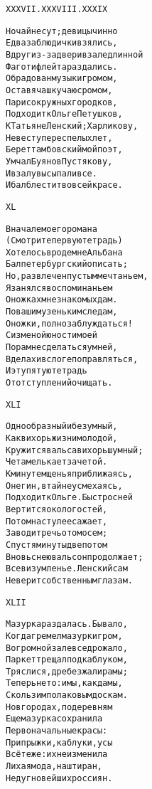 \begin{minipage}[t]{\dimexpr 0.5\textwidth -\tabcolsep-.5pt}
\begin{alltt}\normalfont\centering
XXXVII. XXXVIII. XXXIX

Но чай несут; девицы чинно
Едва за блюдички взялись,
Вдруг из-за двери в зале длинной
Фагот и флейта раздались.
Обрадован музыки громом,
Оставя чашку чаю с ромом,
Парис окружных городков,
Подходит к Ольге Петушков,
К Татьяне Ленский; Харликову,
Невесту переспелых лет,
Берет тамбовский мой поэт,
Умчал Буянов Пустякову,
И в залу высыпали все.
И бал блестит во всей красе.
\end{alltt}
\end{minipage}

\begin{minipage}[t]{\dimexpr 0.5\textwidth -\tabcolsep-.5pt}
\begin{alltt}\normalfont\centering
XL

В начале моего романа
(Смотрите первую тетрадь)
Хотелось вроде мне Альбана
Бал петербургский описать;
Но, развлечен пустым мечтаньем,
Я занялся воспоминаньем
О ножках мне знакомых дам.
По вашим узеньким следам,
О ножки, полно заблуждаться!
С изменой юности моей
Пора мне сделаться умней,
В делах и в слоге поправляться,
И эту пятую тетрадь
От отступлений очищать.
\end{alltt}
\end{minipage}
\clearpage

\begin{minipage}[t]{\dimexpr 0.5\textwidth -\tabcolsep-.5pt}
\begin{alltt}\normalfont\centering
XLI

Однообразный и безумный,
Как вихорь жизни молодой,
Кружится вальса вихорь шумный;
Чета мелькает за четой.
К минуте мщенья приближаясь,
Онегин, втайне усмехаясь,
Подходит к Ольге. Быстро с ней
Вертится около гостей,
Потом на стул ее сажает,
Заводит речь о том о сем;
Спустя минуты две потом
Вновь с нею вальс он продолжает;
Все в изумленье. Ленский сам
Не верит собственным глазам.
\end{alltt}
\end{minipage}

\begin{minipage}[t]{\dimexpr 0.5\textwidth -\tabcolsep-.5pt}
\begin{alltt}\normalfont\centering
XLII

Мазурка раздалась. Бывало,
Когда гремел мазурки гром,
В огромной зале все дрожало,
Паркет трещал под каблуком,
Тряслися, дребезжали рамы;
Теперь не то: и мы, как дамы,
Скользим по лаковым доскам.
Но в городах, по деревням
Еще мазурка сохранила
Первоначальные красы:
Припрыжки, каблуки, усы
Всё те же: их не изменила
Лихая мода, наш тиран,
Недуг новейших россиян.
\end{alltt}
\end{minipage}
\clearpage

